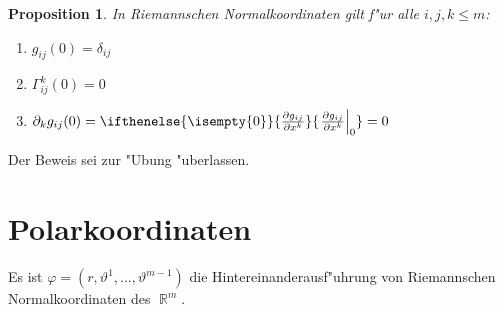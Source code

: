 \documentclass[paper=A4, twoside, chapterprefix=true, bibliography=totoc, headsepline]{scrbook}
\let\temp\phi
\let\phi\varphi
\let\varphi\temp
\let\temp\theta
\let\theta\vartheta
\let\vartheta\temp
\let\temp\epsilon
\let\epsilon\varepsilon
\let\varepsilon\temp
\let\temp\rho
\let\rho\varrho
\let\varrho\temp
\DeclareMathOperator{\R}{\mathbb{R}}
\newcommand{\pdifffrac}[3][]{\ifthenelse{\isempty{#1}}{\frac{\partial #2}{\partial #3}}{\left. \frac{\partial #2}{\partial #3} \right|_{#1}}}
\theoremstyle{plain}
\newtheorem{Prop}[Dfn]{Proposition}
\theoremstyle{nonumberplain}
\theoremstyle{empty}
\theoremstyle{break}
\begin{document}
\begin{Prop}
  In Riemannschen Normalkoordinaten gilt f"ur alle $i,j,k \leq m$:
  \begin{enumerate}[label=(\roman*)]
  \item
    $g_{ij}(0) = \delta_{ij}$
  \item
    $\Gamma^k_{ij}(0) = 0$
  \item
    $\partial_k g_{ij}(0) = \pdifffrac[0]{g_{ij}}{x^k} = 0$
  \end{enumerate}\end{Prop}

Der Beweis sei zur "Ubung "uberlassen.

\section{Polarkoordinaten}

Es ist $\phi = (r, \theta^1, \ldots, \theta^{m-1})$ die Hintereinanderausf"uhrung von Riemannschen Normalkoordinaten des $\R^m$.
\end{document}
